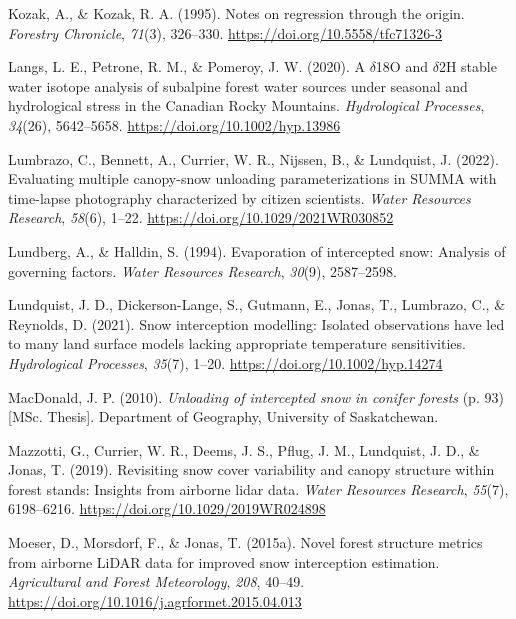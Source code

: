 \documentclass[
  letterpaper,
  DIV=11,
  numbers=noendperiod]{scrartcl}
\newlength{\cslhangindent}
\newenvironment{CSLReferences}[2] %
 {\begin{list}{}{%
  \setlength{\itemindent}{0pt}
  \setlength{\leftmargin}{0pt}
  \setlength{\parsep}{0pt}
  \ifodd #1
   \setlength{\leftmargin}{\cslhangindent}
   \setlength{\itemindent}{-1\cslhangindent}
  \fi
  \setlength{\itemsep}{#2\baselineskip}}}
 {\end{list}}
\begin{document}
\begin{CSLReferences}{1}{0}
Kozak, A., \& Kozak, R. A. (1995). Notes on regression through the
origin. \emph{Forestry Chronicle}, \emph{71}(3), 326--330.
\url{https://doi.org/10.5558/tfc71326-3}

Langs, L. E., Petrone, R. M., \& Pomeroy, J. W. (2020). A
{\(\delta\)}{18O} and {\(\delta\)}{2H} stable water isotope analysis of
subalpine forest water sources under seasonal and hydrological stress in
the {Canadian Rocky Mountains}. \emph{Hydrological Processes},
\emph{34}(26), 5642--5658. \url{https://doi.org/10.1002/hyp.13986}

Lumbrazo, C., Bennett, A., Currier, W. R., Nijssen, B., \& Lundquist, J.
(2022). Evaluating multiple canopy-snow unloading parameterizations in
{SUMMA} with time-lapse photography characterized by citizen scientists.
\emph{Water Resources Research}, \emph{58}(6), 1--22.
\url{https://doi.org/10.1029/2021WR030852}

Lundberg, A., \& Halldin, S. (1994). Evaporation of intercepted snow:
{Analysis} of governing factors. \emph{Water Resources Research},
\emph{30}(9), 2587--2598.

Lundquist, J. D., Dickerson-Lange, S., Gutmann, E., Jonas, T., Lumbrazo,
C., \& Reynolds, D. (2021). Snow interception modelling: {Isolated}
observations have led to many land surface models lacking appropriate
temperature sensitivities. \emph{Hydrological Processes}, \emph{35}(7),
1--20. \url{https://doi.org/10.1002/hyp.14274}

MacDonald, J. P. (2010). \emph{Unloading of intercepted snow in conifer
forests} (p. 93) {[}MSc. Thesis{]}. Department of Geography, University
of Saskatchewan.

Mazzotti, G., Currier, W. R., Deems, J. S., Pflug, J. M., Lundquist, J.
D., \& Jonas, T. (2019). Revisiting snow cover variability and canopy
structure within forest stands: {Insights} from airborne lidar data.
\emph{Water Resources Research}, \emph{55}(7), 6198--6216.
\url{https://doi.org/10.1029/2019WR024898}

Moeser, D., Morsdorf, F., \& Jonas, T. (2015a). Novel forest structure
metrics from airborne {LiDAR} data for improved snow interception
estimation. \emph{Agricultural and Forest Meteorology}, \emph{208},
40--49. \url{https://doi.org/10.1016/j.agrformet.2015.04.013}


\end{CSLReferences}
\end{document}
